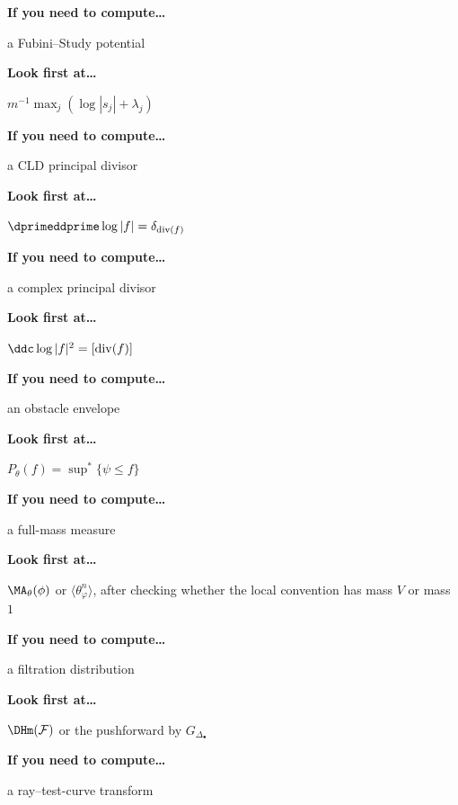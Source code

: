 \medskip
\textbf{If you need to compute\ldots}\par\nopagebreak
a Fubini--Study potential\par\nopagebreak

\textbf{Look first at\ldots}\par\nopagebreak
\(m^{-1}\max_j(\log|s_j|+\lambda_j)\)

\medskip
\textbf{If you need to compute\ldots}\par\nopagebreak
a CLD principal divisor\par\nopagebreak

\textbf{Look first at\ldots}\par\nopagebreak
\(\dprimeddprime\log|f|=\delta_{\operatorname{div}(f)}\)

\medskip
\textbf{If you need to compute\ldots}\par\nopagebreak
a complex principal divisor\par\nopagebreak

\textbf{Look first at\ldots}\par\nopagebreak
\(\ddc\log|f|^2=[\operatorname{div}(f)]\)

\medskip
\textbf{If you need to compute\ldots}\par\nopagebreak
an obstacle envelope\par\nopagebreak

\textbf{Look first at\ldots}\par\nopagebreak
\(P_\theta(f)=\sup^*\{\psi\leq f\}\)

\medskip
\textbf{If you need to compute\ldots}\par\nopagebreak
a full-mass measure\par\nopagebreak

\textbf{Look first at\ldots}\par\nopagebreak
\(\MA_\theta(\phi)\) or
\(\langle\theta_\varphi^n\rangle\), after checking whether the local
convention has mass \(V\) or mass \(1\)

\medskip
\textbf{If you need to compute\ldots}\par\nopagebreak
a filtration distribution\par\nopagebreak

\textbf{Look first at\ldots}\par\nopagebreak
\(\DHm(\mathcal F)\) or the pushforward by \(G_{\Delta_\bullet}\)

\medskip
\textbf{If you need to compute\ldots}\par\nopagebreak
a ray--test-curve transform\par\nopagebreak

